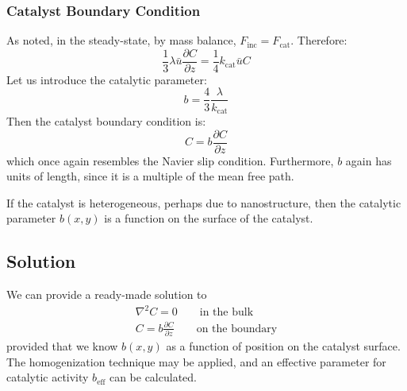 \documentclass[12pt, a4paper, twoside, openright]{book}
\newcommand{\beff}{\ensuremath{b_{\mathrm{eff}}}}
\newcommand{\Finc}{\ensuremath{F_{\mathrm{inc}}}}
\newcommand{\Fcat}{\ensuremath{F_{\mathrm{cat}}}}
\newcommand{\kcat}{\ensuremath{k_{\mathrm{cat}}}}
\begin{document}


\subsubsection{Catalyst Boundary Condition}

As noted, in the steady-state, by mass balance, $\Finc = \Fcat$. Therefore:
\begin{equation}
\frac{1}{3} \lambda \bar{u} \frac{\partial C}{\partial z} = \frac{1}{4} \kcat \bar{u} C
\end{equation}
Let us introduce the catalytic parameter:
\begin{equation}
b = \frac{4}{3} \frac{\lambda}{\kcat}
\end{equation}
Then the catalyst boundary condition is:
\begin{equation}
C = b \frac{\partial C}{\partial z}
\end{equation}
which once again resembles the Navier slip condition.
Furthermore, $b$ again has units of length, since it is a multiple of the mean free path.

If the catalyst is heterogeneous, perhaps due to nanostructure, then the catalytic parameter $b(x,y)$ is a function on the surface of the catalyst.



\subsection{Solution}
We can provide a ready-made solution to
\begin{gather}
\nabla^2 C = 0 \qquad \text{in the bulk} \\
C = b \frac{\partial C}{\partial z} \qquad \text{on the boundary}
\end{gather}
provided that we know $b(x,y)$ as a function of position on the catalyst surface.
The homogenization technique may be applied, and an effective parameter for catalytic activity $\beff$ can be calculated.
\end{document}
